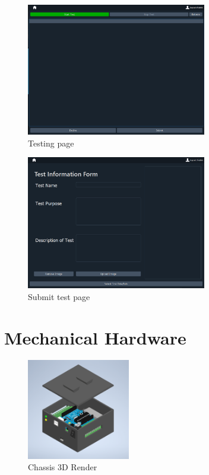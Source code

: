 \documentclass[12pt, titlepage]{article}
\begin{document}
  \begin{figure}[h!]
    \begin{center}
    \includegraphics[width=0.7\textwidth]{testing_page}
    \caption{Testing page}
    \label{Fig_SystemContext} 
    \end{center}
    \end{figure}

  \begin{figure}[h!]
    \begin{center}
    \includegraphics[width=0.7\textwidth]{submit_test_page}
    \caption{Submit test page}
    \label{Fig_SystemContext} 
    \end{center}
    \end{figure}

\newpage
\newpage
\section{Mechanical Hardware}
  \begin{figure}[h!]
    \begin{center}
    \includegraphics[width=0.4\textwidth]{Chassis_3D_Render.png}
    \caption{Chassis 3D Render}
    \label{Fig_SystemContext} 
    \end{center}
    \end{figure}
\end{document}
